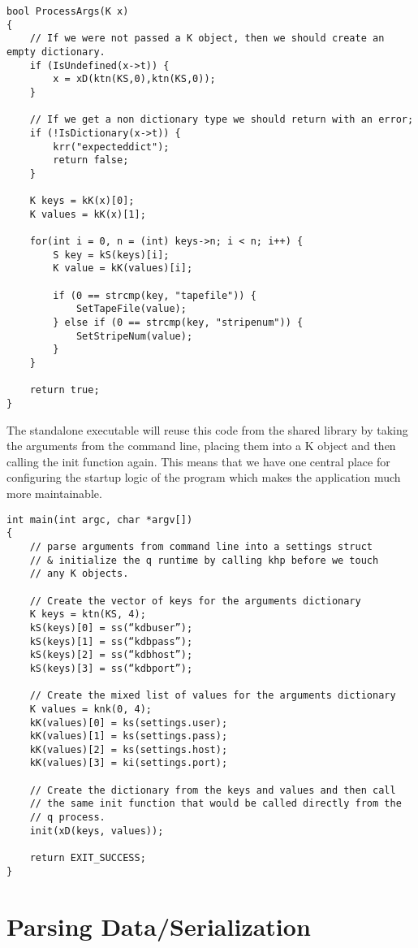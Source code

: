 \begin{lstlisting}
bool ProcessArgs(K x)
{
	// If we were not passed a K object, then we should create an empty dictionary.
	if (IsUndefined(x->t)) {
		x = xD(ktn(KS,0),ktn(KS,0));
	}

	// If we get a non dictionary type we should return with an error;
	if (!IsDictionary(x->t)) {
		krr("expecteddict");
		return false;
	}

	K keys = kK(x)[0];
	K values = kK(x)[1];

	for(int i = 0, n = (int) keys->n; i < n; i++) {
		S key = kS(keys)[i];
		K value = kK(values)[i];

		if (0 == strcmp(key, "tapefile")) {
			SetTapeFile(value);
		} else if (0 == strcmp(key, "stripenum")) {
			SetStripeNum(value);
		}
	}

	return true;
}
\end{lstlisting}

The standalone executable will reuse this code from the shared library by taking the arguments from the
command line, placing them into a K object and then calling the init function again. This means that we
have one central place for configuring the startup logic of the program which makes the application much
more maintainable.

\begin{lstlisting}
int main(int argc, char *argv[])
{
	// parse arguments from command line into a settings struct
	// & initialize the q runtime by calling khp before we touch
	// any K objects.

	// Create the vector of keys for the arguments dictionary
	K keys = ktn(KS, 4);
	kS(keys)[0] = ss(“kdbuser”);
	kS(keys)[1] = ss(“kdbpass”);
	kS(keys)[2] = ss(“kdbhost”);
	kS(keys)[3] = ss(“kdbport”);

	// Create the mixed list of values for the arguments dictionary
	K values = knk(0, 4);
	kK(values)[0] = ks(settings.user);
	kK(values)[1] = ks(settings.pass);
	kK(values)[2] = ks(settings.host);
	kK(values)[3] = ki(settings.port);

	// Create the dictionary from the keys and values and then call
	// the same init function that would be called directly from the
	// q process.
	init(xD(keys, values));

	return EXIT_SUCCESS;
}
\end{lstlisting}

\section{Parsing Data/Serialization}

